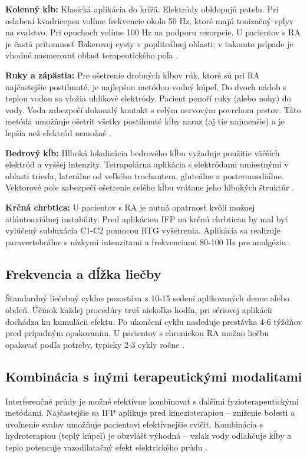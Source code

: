 \textbf{Kolenný kĺb:} Klasická aplikácia do krížä. Elektródy obklopujú patelu. Pri oslabení kvadricepsu volíme frekvencie okolo 50 Hz, ktoré majú tonizačný vplyv na svalstvo. Pri opuchoch volíme 100 Hz na podporu rezorpcie. U pacientov s RA je častá prítomnosť Bakerovej cysty v popliteálnej oblasti; v takomto prípade je vhodné nasmerovať oblasť terapeutického poľa \parencite{Kolar2012}.

\textbf{Ruky a zápästia:} Pre ošetrenie drobných kĺbov rúk, ktoré sú pri RA najčastejšie postihnuté, je najlepšou metódou vodný kúpeľ. Do dvoch nádob s teplou vodou sa vložia uhlikové elektródy. Pacient ponoří ruky (alebo nohy) do vody. Voda zabezpečí dokonalý kontakt s celým nervovým povrchom prstov. Táto metóda umožňuje ošetriť všetky postihnuté kĺby naraz (aj tie najmenšie) a je lepšia než elektród nemožné \parencite{Navratil2019}.

\textbf{Bedrový kĺb:} Hlboká lokalizácia bedrového kĺbu vyžaduje použitie väčších elektród a vyššej intenzity. Tetrapolárna aplikácia s elektródami umiestnými v oblasti triesla, laterálne od veľkého trochantera, gluteálne a posteromediálne. Vektorové pole zabezpečí ošetrenie celého kĺbu vrátane jeho hlbokých štruktúr \parencite{Robertson2006}.

\textbf{Krčná chrbtica:} U pacientov s RA je nutná opatrnosť kvôli možnej atlántoaxiálnej instability. Pred aplikáciou IFP na krčnú chrbticau by mal byť vylúčený subluxácia C1-C2 pomocou RTG vyšetrenia. Aplikácia sa realizuje paravertebrálne s nízkymi intenzitami a frekvenciami 80-100 Hz pre analgéziu \parencite{Podebradsky2009}.

\subsection{Frekvencia a dĺžka liečby}

Štandardný liečebný cyklus pozostáva z 10-15 sedení aplikovaných denne alebo obdeň. Účinok každej procedúry trvá niekoľko hodín, pri sériovej aplikácii dochádza ku kumulácii efektu. Po ukončení cyklu nasleduje prestávka 4-6 týždňov pred prípadným opakovaním. U pacientov s chronickou RA možno liečbu opakovať podľa potreby, typicky 2-3 cykly ročne \parencite{Capko1998}.

\subsection{Kombinácia s inými terapeutickými modalitami}

Interferenčné prúdy je možné efektívne kombinovať s ďalšími fyzioterapeutickými metódami. Najčastejšie sa IFP aplikuje pred kinezioterapiou – zníženie bolesti a uvoľnenie svalov umožňuje pacientovi efektívnejšie cvičiť. Kombinácia s hydroterapiou (teplý kúpeľ) je obzvlášť výhodná – vzlak vody odľahčuje kĺby a teplo potencuje vazodilatačný efekt elektrického prúdu \parencite{Guth2010}.

